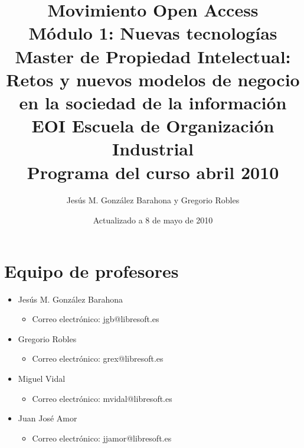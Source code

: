 \documentclass[a4paper,12pt]{article}
\title{Movimiento Open Access \\
Módulo 1: Nuevas tecnologías \\
Master de Propiedad Intelectual: \\
Retos y nuevos modelos de negocio en la sociedad de la información \\
EOI Escuela de Organización Industrial \\
Programa del curso abril 2010}
\author{Jesús M. González Barahona y Gregorio Robles}
\date{Actualizado a 8 de mayo de 2010}
\begin{document}
\maketitle

\newpage

\tableofcontents

\newpage

\section{Equipo de profesores}

\begin{itemize}
\item Jesús M. González Barahona
  \begin{itemize}
  \item Correo electrónico: jgb@libresoft.es
  \end{itemize}
\item Gregorio Robles
  \begin{itemize}
  \item Correo electrónico: grex@libresoft.es
  \end{itemize}
\item Miguel Vidal
  \begin{itemize}
  \item Correo electrónico: mvidal@libresoft.es
  \end{itemize}
\item Juan José Amor
  \begin{itemize}
  \item Correo electrónico: jjamor@libresoft.es
  \end{itemize}
\end{itemize}



\end{document}
